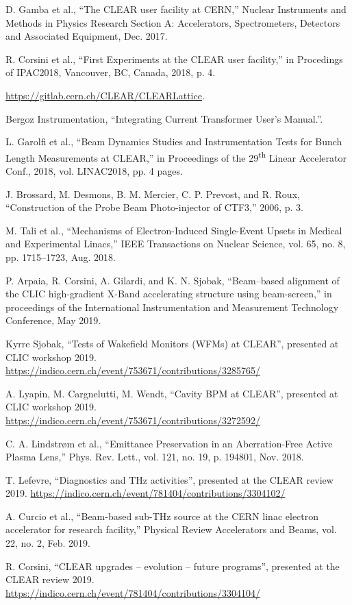 \documentclass[a4paper,
               keeplastbox,   %
               ]{jacow}
\begin{document}
\begin{thebibliography}{99}
 D. Gamba et al., “The CLEAR user facility at CERN,” Nuclear Instruments and Methods in Physics Research Section A: Accelerators, Spectrometers, Detectors and Associated Equipment, Dec. 2017.

 R. Corsini et al., “First Experiments at the CLEAR user facility,” in Procedings of IPAC2018, Vancouver, BC, Canada, 2018, p. 4.

 \url{https://gitlab.cern.ch/CLEAR/CLEARLattice}.

 Bergoz Instrumentation, “Integrating Current Transformer User’s Manual.”.

 L. Garolfi et al., “Beam Dynamics Studies and Instrumentation Tests for Bunch Length Measurements at CLEAR,” in Proceedings of the 29\textsuperscript{th} Linear Accelerator Conf., 2018, vol. LINAC2018, pp. 4 pages.

 J. Brossard, M. Desmons, B. M. Mercier, C. P. Prevost, and R. Roux, “Construction of the Probe Beam Photo-injector of CTF3,” 2006, p. 3.

 M. Tali et al., “Mechanisms of Electron-Induced Single-Event Upsets in Medical and Experimental Linacs,” IEEE Transactions on Nuclear Science, vol. 65, no. 8, pp. 1715–1723, Aug. 2018.

 P. Arpaia, R. Corsini, A. Gilardi, and K. N. Sjobak, “Beam–based alignment of the CLIC high-gradient X-Band accelerating structure using beam-screen,” in proceedings of the International Instrumentation and Measurement Technology Conference, May 2019.

 Kyrre Sjobak, ``Tests of Wakefield Monitors (WFMs) at CLEAR'', presented at CLIC workshop 2019. \url{https://indico.cern.ch/event/753671/contributions/3285765/}

 A. Lyapin, M. Cargnelutti, M. Wendt, ``Cavity BPM at CLEAR'', presented at CLIC workshop 2019. \url{https://indico.cern.ch/event/753671/contributions/3272592/}

 C. A. Lindstrøm et al., “Emittance Preservation in an Aberration-Free Active Plasma Lens,” Phys. Rev. Lett., vol. 121, no. 19, p. 194801, Nov. 2018.

 T. Lefevre, ``Diagnostics and THz activities'', presented at the CLEAR review 2019. \url{https://indico.cern.ch/event/781404/contributions/3304102/}

 A. Curcio et al., “Beam-based sub-THz source at the CERN linac electron accelerator for research facility,” Physical Review Accelerators and Beams, vol. 22, no. 2, Feb. 2019.

 R. Corsini, ``CLEAR upgrades -- evolution -- future programs'', presented at the CLEAR review 2019. \url{https://indico.cern.ch/event/781404/contributions/3304104/}

\end{thebibliography}
\end{document}

